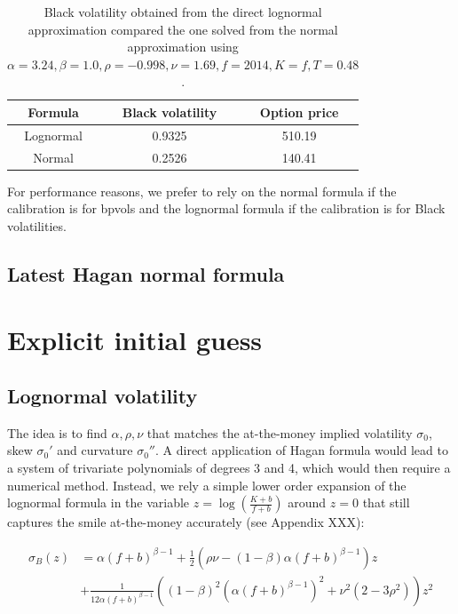 \documentclass[]{rAMF2e}
\begin{document}
\begin{table}[h]
\begin{center}
\caption{\label{tbl:lognormal_high_alpha}Black volatility obtained from the direct lognormal approximation compared the one solved from the normal approximation using $\alpha=3.24,\beta=1.0,\rho=-0.998, \nu=1.69, f=2014, K=f, T=0.48$.}
\begin{tabular}{|c|c|c|}
\hline
Formula & Black volatility & Option price \\ 
\hline
Lognormal & 0.9325 & 510.19 \\
Normal & 0.2526 & 140.41 \\
\hline
\end{tabular}
\end{center}
\end{table}
For performance reasons, we prefer to rely on the normal formula if the calibration is for bpvols and the lognormal formula if the calibration is for Black volatilities.

\subsection{Latest Hagan normal formula}

\section{Explicit initial guess}
\subsection{Lognormal volatility}
The idea is to find $\alpha, \rho, \nu$ that matches the at-the-money implied volatility $\sigma_0$, skew $\sigma_0'$ and curvature $\sigma_0''$. A direct application of Hagan formula would lead to a system of trivariate polynomials of degrees 3 and 4, which would then require a numerical method. Instead, we rely a simple lower order expansion of the lognormal formula in the variable $z=\log\left(\frac{K+b}{f+b}\right)$ around $z=0$ that still captures the smile at-the-money accurately (see Appendix XXX):

\begin{align}
\sigma_B(z) &= \alpha (f+b)^{\beta-1} + \frac{1}{2}\left(\rho \nu - (1-\beta)\alpha (f+b)^{\beta-1}\right)z \nonumber\\
&+ \frac{1}{12\alpha (f+b)^{\beta-1}}\left((1-\beta)^2(\alpha (f+b)^{\beta-1})^2 + \nu^2(2-3\rho^2)\right)z^2
\end{align}
\end{document}
